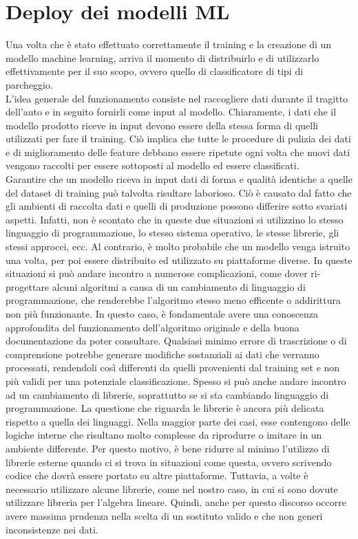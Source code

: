 \chapter{Deploy dei modelli ML}

Una volta che è stato effettuato correttamente il training e la creazione di un modello
machine learning, arriva il momento di distribuirlo e di utilizzarlo effettivamente
per il suo scopo, ovvero quello di classificatore di tipi di parcheggio.\\
L'idea generale del funzionamento consiste nel raccogliere dati durante il tragitto
dell'auto e in seguito fornirli come input al modello. Chiaramente, i dati che 
il modello prodotto riceve in input devono essere della stessa forma di quelli
utilizzati per fare il training. Ciò implica che tutte le procedure di pulizia
dei dati e di miglioramento delle feature debbano essere ripetute ogni volta che
nuovi dati vengono raccolti per essere sottoposti al modello ed essere 
classificati.\\
Garantire che un modello riceva in input dati di forma e qualità identiche a
quelle del dataset di training può talvolta risultare laborioso. Ciò è causato 
dal fatto che gli ambienti di raccolta dati e quelli di produzione possono 
differire sotto svariati aspetti. Infatti, non è scontato che in queste due
situazioni si utilizzino lo stesso linguaggio di programmazione, lo stesso sistema
operativo, le stesse librerie, gli stessi approcci, ecc. Al contrario, è
molto probabile che un modello venga istruito una volta, per poi essere 
distribuito ed utilizzato su piattaforme diverse. In queste situazioni si può
andare incontro a numerose complicazioni, come dover ri-progettare alcuni
algoritmi a causa di un cambiamento di linguaggio di programmazione, che 
renderebbe l'algoritmo stesso meno efficente o addirittura non più funzionante.
In questo caso, è fondamentale avere una conoscenza approfondita del funzionamento
dell'algoritmo originale e della buona documentazione da poter consultare. 
Qualsiasi minimo errore di trascrizione o di comprensione potrebbe generare
modifiche sostanziali ai dati che verranno processati, rendendoli così differenti
da quelli provenienti dal training set e non più validi per una potenziale
classificazione. Spesso si può anche andare incontro ad un cambiamento di librerie,
soprattutto se si sta cambiando linguaggio di programmazione. La questione che
riguarda le librerie è ancora più delicata rispetto a quella dei linguaggi. Nella
maggior parte dei casi, esse contengono delle logiche interne che risultano molto
complesse da riprodurre o imitare in un ambiente differente. Per questo motivo,
è bene ridurre al minimo l'utilizzo di librerie esterne quando ci si trova in 
situazioni come questa, ovvero scrivendo codice che dovrà essere portato su altre
piattaforme. Tuttavia, a volte è necessario utilizzare alcune librerie, come nel
nostro caso, in cui si sono dovute utilizzare libreria per l'algebra lineare.
Quindi, anche per questo discorso occorre avere massima prudenza nella scelta di
un sostituto valido e che non generi inconsistenze nei dati.

